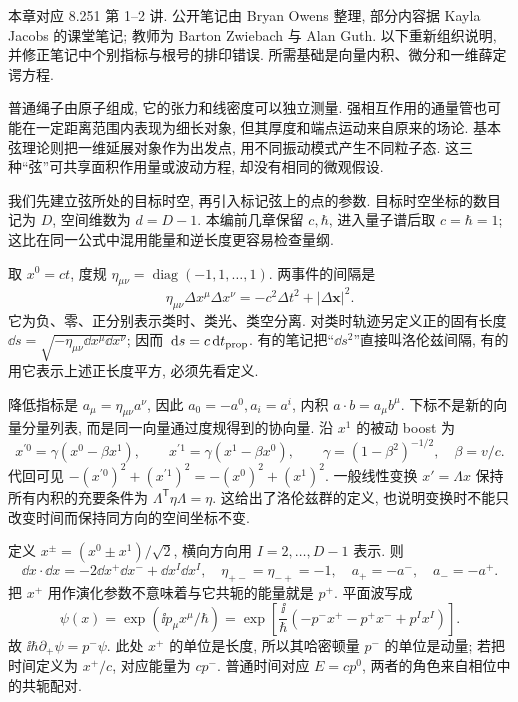 \label{ch:basic-spacetime}
本章对应 8.251 第 1--2 讲. 公开笔记由 Bryan Owens 整理, 部分内容据 Kayla Jacobs 的课堂笔记; 教师为 Barton Zwiebach 与 Alan Guth. 以下重新组织说明, 并修正笔记中个别指标与根号的排印错误. 所需基础是向量内积、微分和一维薛定谔方程.

普通绳子由原子组成, 它的张力和线密度可以独立测量. 强相互作用的通量管也可能在一定距离范围内表现为细长对象, 但其厚度和端点运动来自原来的场论. 基本弦理论则把一维延展对象作为出发点, 用不同振动模式产生不同粒子态. 这三种“弦”可共享面积作用量或波动方程, 却没有相同的微观假设.

我们先建立弦所处的目标时空, 再引入标记弦上的点的参数. 目标时空坐标的数目记为 $D$, 空间维数为 $d=D-1$. 本编前几章保留 $c,\hbar$, 进入量子谱后取 $c=\hbar=1$; 这比在同一公式中混用能量和逆长度更容易检查量纲.

取 $x^0=ct$, 度规 $\eta_{\mu\nu}=\operatorname{diag}(-1,1,\ldots,1)$. 两事件的间隔是
\[
 \eta_{\mu\nu}\Delta x^\mu\Delta x^\nu
 =-c^2\Delta t^2+|\Delta\boldsymbol x|^2.
\]
它为负、零、正分别表示类时、类光、类空分离. 对类时轨迹另定义正的固有长度 $\dd s=\sqrt{-\eta_{\mu\nu}\dd x^\mu\dd x^\nu}$; 因而 $\,\mathrm d s=c\,\mathrm d t_{\rm prop}$. 有的笔记把“$\dd s^2$”直接叫洛伦兹间隔, 有的用它表示上述正长度平方, 必须先看定义.

降低指标是 $a_\mu=\eta_{\mu\nu}a^\nu$, 因此 $a_0=-a^0,a_i=a^i$, 内积 $a\cdot b=a_\mu b^\mu$. 下标不是新的向量分量列表, 而是同一向量通过度规得到的协向量. 沿 $x^1$ 的被动 boost 为
\[
 x^{\prime0}=\gamma(x^0-\beta x^1),\qquad
 x^{\prime1}=\gamma(x^1-\beta x^0),\qquad
 \gamma=(1-\beta^2)^{-1/2},\quad\beta=v/c.
\]
代回可见 $-(x^{\prime0})^2+(x^{\prime1})^2=-(x^0)^2+(x^1)^2$. 一般线性变换 $x'=\Lambda x$ 保持所有内积的充要条件为 $\Lambda^{\mathsf T}\eta\Lambda=\eta$. 这给出了洛伦兹群的定义, 也说明变换时不能只改变时间而保持同方向的空间坐标不变.

定义 $x^\pm=(x^0\pm x^1)/\sqrt2$, 横向方向用 $I=2,\ldots,D-1$ 表示. 则
\[
 \dd x\cdot\dd x=-2\dd x^+\dd x^-+\dd x^I\dd x^I,
 \quad\eta_{+-}=\eta_{-+}=-1,
 \quad a_+=-a^-,\quad a_-=-a^+.
\]
把 $x^+$ 用作演化参数不意味着与它共轭的能量就是 $p^+$. 平面波写成
\[
 \psi(x)=\exp(\ii p_\mu x^\mu/\hbar)
 =\exp\!\left[\frac{\ii}{\hbar}(-p^-x^+-p^+x^-+p^Ix^I)\right].
\]
故 $\ii\hbar\partial_+\psi=p^-\psi$. 此处 $x^+$ 的单位是长度, 所以其哈密顿量 $p^-$ 的单位是动量; 若把时间定义为 $x^+/c$, 对应能量为 $cp^-$. 普通时间对应 $E=cp^0$, 两者的角色来自相位中的共轭配对.

